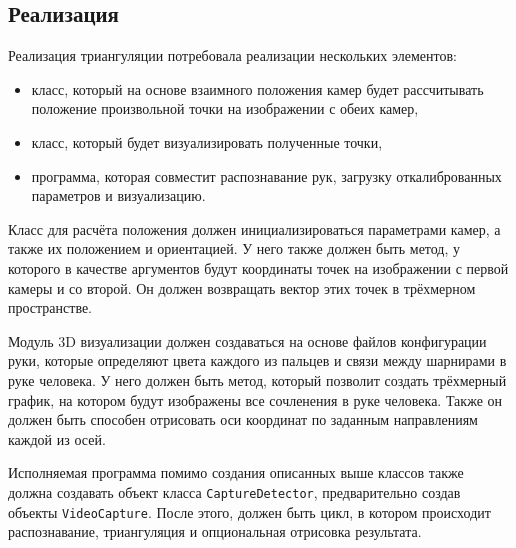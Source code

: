 \documentclass[14pt, a4paper]{extarticle}
\begin{document}
\subsection{Реализация}
Реализация триангуляции потребовала реализации нескольких элементов:
\begin{itemize}
  \item класс, который на основе взаимного положения камер будет рассчитывать
    положение произвольной точки на изображении с обеих камер,
  \item класс, который будет визуализировать полученные точки,
  \item программа, которая совместит распознавание рук, загрузку
    откалиброванных параметров и визуализацию.
\end{itemize}

Класс для расчёта положения должен инициализироваться параметрами камер, а
также их положением и ориентацией. У него также должен быть метод, у которого в
качестве аргументов будут координаты точек на изображении с первой камеры и со
второй. Он должен возвращать вектор этих точек в трёхмерном пространстве. 

Модуль 3D визуализации должен создаваться на основе файлов конфигурации руки,
которые определяют цвета каждого из пальцев и связи между шарнирами в руке
человека. У него должен быть метод, который позволит создать трёхмерный график,
на котором будут изображены все сочленения в руке человека. Также он должен
быть способен отрисовать оси координат по заданным направлениям каждой из осей.

Исполняемая программа помимо создания описанных выше классов также должна
создавать объект класса \texttt{CaptureDetector}, предварительно создав объекты
\texttt{VideoCapture}. После этого, должен быть цикл, в котором происходит
распознавание, триангуляция и опциональная отрисовка результата.
\end{document}
